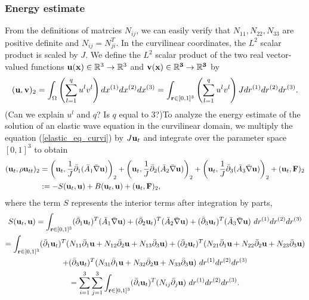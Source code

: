 \documentclass[a4paper]{article}
\begin{document}
\subsubsection{Energy estimate}
From the definitions of matrcies $N_{ij}$, we can easily verify that $N_{11}, N_{22}, N_{33}$ are positive definite and $N_{ij} = N_{ji}^T$. In the curvilinear coordinates, the $L^2$ scalar product is scaled by $J$. We define the $L^2$ scalar product of the two real vector-valued functions ${\bf u}({\bf x})\in\mathbb{R}^3\rightarrow \mathbb{R}^3$ and ${\bf v}(\bf x)\in\mathbb{R}^3\rightarrow \mathbb{R}^3$ by
\begin{equation*}
({\bf u},{\bf v})_2 = \int_{\Omega}  \left(\sum_{l=1}^q u^{l}v^{l}\right)dx^{(1)}dx^{(2)}dx^{(3)} = \int_{{\bf r}\in[0,1]^3} \left(\sum_{l=1}^q u^{l}v^{l}\right)Jdr^{(1)}dr^{(2)}dr^{(3)}.
\end{equation*}
{\color{red}(Can we explain $u^l$ and $q$? Is $q$ equal to 3?)}To analyze the energy estimate of the solution of an elastic wave equation in the curvilinear domain, we multiply the equation (\ref{elastic_eq_curvi}) by $J{\bf u}_t$ and integrate over the parameter space $[0,1]^3$ to obtain
\begin{align}\label{time_deri_curvi}
({\bf u}_t,\rho {\bf u}_{tt})_2 &= \left({\bf u}_t,\frac{1}{J}\bar{\partial}_1(\bar{A}_1\bar{\nabla}{\bf u})\right)_2+ \left({\bf u}_t,\frac{1}{J}\bar{\partial}_2(\bar{A}_2\bar{\nabla}{\bf u})\right)_2+ \left({\bf u}_t,\frac{1}{J}\bar{\partial}_3(\bar{A}_3\bar{\nabla}{\bf u})\right)_2+({\bf u}_t, {\bf F})_2\nonumber\\
&:= -S({\bf u}_t,{\bf u}) + B({\bf u}_t,{\bf u}) + ({\bf u}_t,{\bf F})_2,
\end{align}
where the term $S$ represents the interior terms after integration by parts,
\begin{multline*}
S({\bf u}_t,{\bf u}) = \int_{{\bf r}\in[0,1]^3} (\bar{\partial}_1 {\bf u}_t)^T ({\bar A}_1\bar{\nabla}{\bf u}) + (\bar{\partial}_2 {\bf u}_t)^T ({\bar A}_2\bar{\nabla}{\bf u}) + (\bar{\partial}_3 {\bf u}_t)^T ({\bar A}_3\bar{\nabla}{\bf u})\ dr^{(1)}dr^{(2)}dr^{(3)}\\
 = \int_{{\bf r}\in[0,1]^3} (\bar{\partial}_1 {\bf u}_t)^T (N_{11}\bar{\partial}_1{\bf u} +N_{12}\bar{\partial}_2{\bf u}+ N_{13}\bar{\partial}_3{\bf u}) + (\bar{\partial}_2 {\bf u}_t)^T (N_{21}\bar{\partial}_1{\bf u} +N_{22}\bar{\partial}_2{\bf u}+ N_{23}\bar{\partial}_3{\bf u}) \\
 +(\bar{\partial}_3 {\bf u}_t)^T (N_{31}\bar{\partial}_1{\bf u} +N_{32}\bar{\partial}_2{\bf u}+ N_{33}\bar{\partial}_3{\bf u})\ dr^{(1)}dr^{(2)}dr^{(3)}\\
 = \sum_{i = 1}^3\sum_{j=1}^3  \int_{{\bf r}\in[0,1]^3} (\bar{\partial}_i {\bf u}_t)^T(N_{ij}\bar{\partial}_j {\bf u})\ dr^{(1)}dr^{(2)}dr^{(3)}.
\end{multline*}
\end{document}
